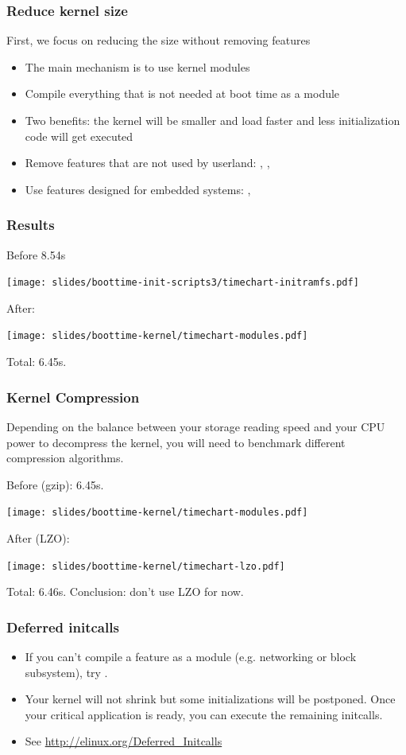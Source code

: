 \begin{frame}
\frametitle{Reduce kernel size}
First, we focus on reducing the size without removing features
\begin{itemize}
	\item The main mechanism is to use kernel modules
	\item Compile everything that is not needed at boot time as a
		module
	\item Two benefits: the kernel will be smaller and load faster and
		less initialization code will get executed
	\item Remove features that are not used by userland:
		, ,
	\item Use features designed for embedded systems:
		, 
\end{itemize}
\end{frame}

\begin{frame}
\frametitle{Results}
Before 8.54s
\begin{center}
    \texttt{[image: slides/boottime-init-scripts3/timechart-initramfs.pdf]}
\end{center}
After:
\begin{center}
    \texttt{[image: slides/boottime-kernel/timechart-modules.pdf]}
\end{center}
Total: 6.45s.
\end{frame}

\begin{frame}
\frametitle{Kernel Compression}
Depending on the balance between your storage reading speed and your
CPU power to decompress the kernel, you will need to benchmark
different compression algorithms.

Before (gzip): 6.45s.
\begin{center}
    \texttt{[image: slides/boottime-kernel/timechart-modules.pdf]}
\end{center}
After (LZO):
\begin{center}
    \texttt{[image: slides/boottime-kernel/timechart-lzo.pdf]}
\end{center}
Total: 6.46s.
Conclusion: don't use LZO for now.
\end{frame}

\begin{frame}
\frametitle{Deferred initcalls}
\begin{itemize}
\item If you can't compile a feature as a module (e.g. networking or block
      subsystem), try .
\item Your kernel will not shrink but some initializations will be
      postponed. Once your critical application is ready, you can
      execute the remaining initcalls.
\item See \url{http://elinux.org/Deferred_Initcalls}
\end{itemize}
\end{frame}

